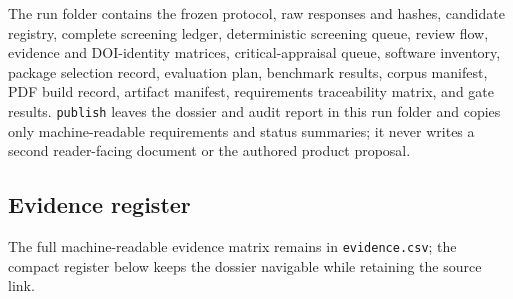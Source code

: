 \documentclass[11pt]{article}
\begin{document}
The run folder contains the frozen protocol, raw responses and hashes, candidate registry, complete screening ledger, deterministic screening queue, review flow, evidence and DOI-identity matrices, critical-appraisal queue, software inventory, package selection record, evaluation plan, benchmark results, corpus manifest, PDF build record, artifact manifest, requirements traceability matrix, and gate results. \texttt{publish} leaves the dossier and audit report in this run folder and copies only machine-readable requirements and status summaries; it never writes a second reader-facing document or the authored product proposal.

\hypertarget{evidence-register}{%
\subsection{Evidence register}\label{evidence-register}}

The full machine-readable evidence matrix remains in \texttt{evidence.csv}; the compact register below keeps the dossier navigable while retaining the source link.
\end{document}
